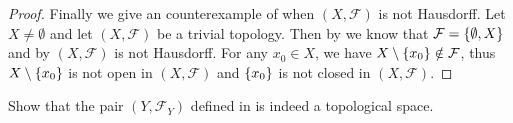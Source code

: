 \begin{proof}
  Finally we give an counterexample of  when \((X, \mathcal{F})\) is not Hausdorff.
  Let \(X \neq \emptyset\) and let \((X, \mathcal{F})\) be a trivial topology.
  Then by  we know that \(\mathcal{F} = \left\lbrace\emptyset, X\right\rbrace\) and by  \((X, \mathcal{F})\) is not Hausdorff.
  For any \(x_0 \in X\), we have \(X \setminus \left\lbrace x_0\right\rbrace \notin \mathcal{F}\), thus \(X \setminus \left\lbrace x_0\right\rbrace\) is not open in \((X, \mathcal{F})\) and \(\left\lbrace x_0\right\rbrace\) is not closed in \((X, \mathcal{F})\).
\end{proof}

\begin{ex}\label{ii:ex:2.5.12}
  Show that the pair \((Y, \mathcal{F}_Y)\) defined in  is indeed a topological space.
\end{ex}

